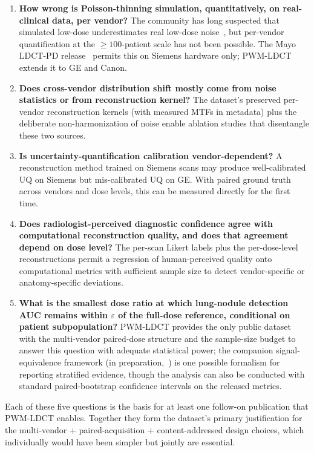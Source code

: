 \documentclass[twoside,11pt]{article}
\begin{document}
\begin{enumerate}
    \item \textbf{How wrong is Poisson-thinning simulation, quantitatively, on real-clinical data, per vendor?} The community has long suspected that simulated low-dose underestimates real low-dose noise~\citep{wang2020deeplearningreview}, but per-vendor quantification at the $\geq 100$-patient scale has not been possible. The Mayo LDCT-PD release~\citep{mccollough2020mayo} permits this on Siemens hardware only; PWM-LDCT extends it to GE and Canon.
    \item \textbf{Does cross-vendor distribution shift mostly come from noise statistics or from reconstruction kernel?} The dataset's preserved per-vendor reconstruction kernels (with measured MTFs in metadata) plus the deliberate non-harmonization of noise enable ablation studies that disentangle these two sources.
    \item \textbf{Is uncertainty-quantification calibration vendor-dependent?} A reconstruction method trained on Siemens scans may produce well-calibrated UQ on Siemens but mis-calibrated UQ on GE. With paired ground truth across vendors and dose levels, this can be measured directly for the first time.
    \item \textbf{Does radiologist-perceived diagnostic confidence agree with computational reconstruction quality, and does that agreement depend on dose level?} The per-scan Likert labels plus the per-dose-level reconstructions permit a regression of human-perceived quality onto computational metrics with sufficient sample size to detect vendor-specific or anatomy-specific deviations.
    \item \textbf{What is the smallest dose ratio at which lung-nodule detection AUC remains within $\varepsilon$ of the full-dose reference, conditional on patient subpopulation?} PWM-LDCT provides the only public dataset with the multi-vendor paired-dose structure and the sample-size budget to answer this question with adequate statistical power; the companion signal-equivalence framework (in preparation,~\citealt{ws2framework}) is one possible formalism for reporting stratified evidence, though the analysis can also be conducted with standard paired-bootstrap confidence intervals on the released metrics.
\end{enumerate}

Each of these five questions is the basis for at least one follow-on publication that PWM-LDCT enables. Together they form the dataset's primary justification for the multi-vendor + paired-acquisition + content-addressed design choices, which individually would have been simpler but jointly are essential.
\end{document}
